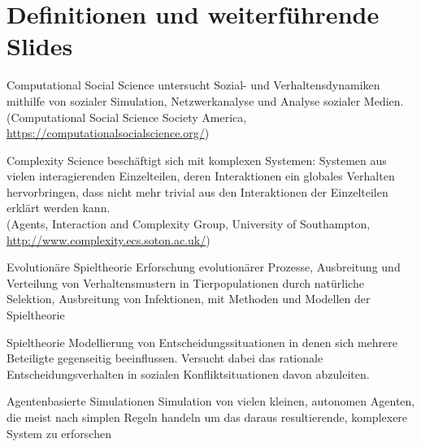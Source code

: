 \section*{Definitionen und weiterführende Slides}
\begin{frame}[label=computational_soc]
	\begin{beamerboxesrounded}{Computational Social Science} 
		untersucht Sozial- und Verhaltensdynamiken mithilfe von sozialer Simulation, Netzwerkanalyse und Analyse sozialer Medien.\\
		{\large(Computational Social Science Society America, \url{https://computationalsocialscience.org/})}
	\end{beamerboxesrounded}
\end{frame}

\begin{frame}[label=complexity_science]
	\begin{beamerboxesrounded}{Complexity Science} 
		beschäftigt sich mit komplexen Systemen: Systemen aus vielen interagierenden Einzelteilen, deren Interaktionen ein globales Verhalten hervorbringen, dass nicht mehr trivial aus den Interaktionen  der Einzelteilen erklärt werden kann.\\
		{\large(Agents, Interaction and Complexity Group, University of Southampton, \url{http://www.complexity.ecs.soton.ac.uk/})}
	\end{beamerboxesrounded}
\end{frame}

\begin{frame}[label=game_theory]
	\begin{beamerboxesrounded}{Evolutionäre Spieltheorie} 
		Erforschung evolutionärer Prozesse, Ausbreitung und Verteilung von Verhaltensmustern in Tierpopulationen durch natürliche Selektion, Ausbreitung von Infektionen, mit Methoden und Modellen der Spieltheorie
	\end{beamerboxesrounded}

	\vspace{2\baselineskip}
	\begin{beamerboxesrounded}{Spieltheorie}
		Modellierung von Entscheidungssituationen in denen sich mehrere Beteiligte gegenseitig beeinflussen. Versucht dabei das rationale Entscheidungsverhalten in sozialen Konfliktsituationen davon abzuleiten.
	\end{beamerboxesrounded}
\end{frame}

\begin{frame}[label=agents]
	\begin{beamerboxesrounded}{Agentenbasierte Simulationen} 
		Simulation von vielen kleinen, autonomen Agenten, die meist nach simplen Regeln handeln um das daraus resultierende, komplexere System zu erforschen
	\end{beamerboxesrounded}
\end{frame}

